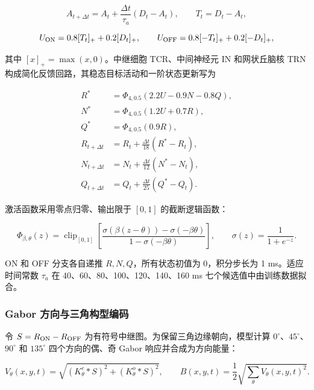 \begin{equation}
A_{t+\Delta t}=A_t+\frac{\Delta t}{\tau_a}(D_t-A_t),\qquad T_t=D_t-A_t,
\end{equation}

\begin{equation}
U_{\rm ON}=0.8[T_t]_++0.2[D_t]_+,\qquad
U_{\rm OFF}=0.8[-T_t]_++0.2[-D_t]_+,
\end{equation}

其中 \([x]_+=\max(x,0)\)。中继细胞 TCR、中间神经元 IN 和网状丘脑核 TRN 构成简化反馈回路，其稳态目标活动和一阶状态更新写为

\begin{equation}
\begin{aligned}
R^*&=\Phi_{4,0.5}(2.2U-0.9N-0.8Q),\\
N^*&=\Phi_{4,0.5}(1.2U+0.7R),\\
Q^*&=\Phi_{4,0.5}(0.9R),\\
R_{t+\Delta t}&=R_t+\frac{\Delta t}{18}(R^*-R_t),\\
N_{t+\Delta t}&=N_t+\frac{\Delta t}{12}(N^*-N_t),\\
Q_{t+\Delta t}&=Q_t+\frac{\Delta t}{25}(Q^*-Q_t).
\end{aligned}
\end{equation}

激活函数采用零点归零、输出限于 \([0,1]\) 的截断逻辑函数：

\begin{equation}
\Phi_{\beta,\theta}(z)=\operatorname{clip}_{[0,1]}\!\left[
\frac{\sigma(\beta(z-\theta))-\sigma(-\beta\theta)}
{1-\sigma(-\beta\theta)}\right],\qquad \sigma(z)=\frac{1}{1+e^{-z}}.
\end{equation}

ON 和 OFF 分支各自递推 \(R,N,Q\)，所有状态初值为 0，积分步长为 1 ms。适应时间常数 \(\tau_a\) 在 40、60、80、100、120、140、160 ms 七个候选值中由训练数据拟合。

\subsubsection{Gabor 方向与三角构型编码}

令 \(S=R_{\rm ON}-R_{\rm OFF}\) 为有符号中继图。为保留三角边缘朝向，模型计算 \(0^\circ\)、\(45^\circ\)、\(90^\circ\) 和 \(135^\circ\) 四个方向的偶、奇 Gabor 响应并合成为方向能量：

\begin{equation}
V_\theta(x,y,t)=\sqrt{(K^e_\theta*S)^2+(K^o_\theta*S)^2},\qquad
B(x,y,t)=\frac{1}{2}\sqrt{\sum_\theta V_\theta(x,y,t)^2}.
\end{equation}

